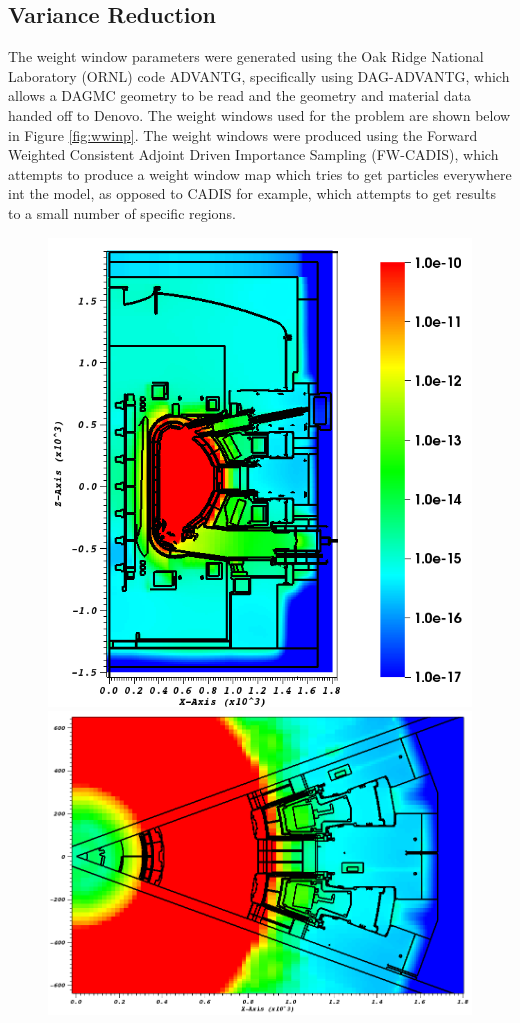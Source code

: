 \documentclass[12pt]{article}
\begin{document}
\subsection{Variance Reduction}
The weight window parameters were generated using the Oak Ridge National Laboratory (ORNL) code ADVANTG, specifically using DAG-ADVANTG, which allows a DAGMC geometry to be read and the geometry and material data handed off to Denovo. The weight windows used for the problem are shown below in Figure \ref{fig:wwinp}. The weight windows were produced using the Forward Weighted Consistent Adjoint Driven Importance Sampling (FW-CADIS), which attempts to produce a weight window map which tries to get particles everywhere int the model, as opposed to CADIS for example, which attempts to get results to a small number of specific regions.
\begin{figure}[ht!]
  \centering
  \includegraphics[scale=0.4]{../plots/wwinp/wwinp_y0.png}
  \includegraphics[scale=0.3]{../plots/wwinp/wwinp_z0.png}

\end{figure}
\end{document}
